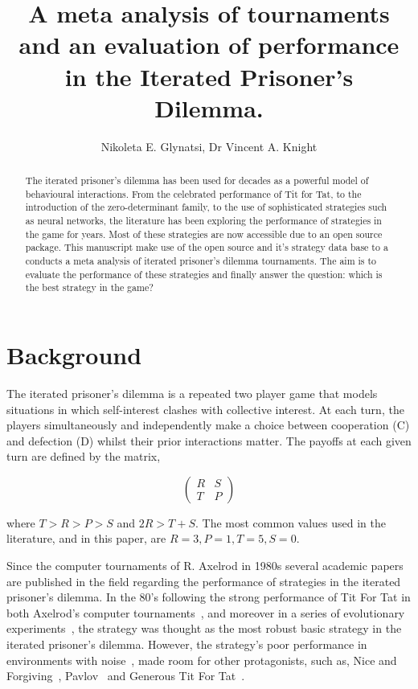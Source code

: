 \documentclass{article}
\title{A meta analysis of tournaments and an evaluation of performance in the
Iterated Prisoner's Dilemma.}
\author{Nikoleta E. Glynatsi, Dr Vincent A. Knight}
\date{}
\begin{document}
\maketitle

\begin{abstract}

The iterated prisoner's dilemma has been used for decades as a powerful model of
behavioural interactions. From the celebrated performance of Tit for Tat, to the
introduction of the zero-determinant family, to the use of sophisticated
strategies such as neural networks, the literature has been exploring the
performance of strategies in the game for years. Most of these strategies
are now accessible due to an open source package. This manuscript make use
of the open source and it's strategy data base to a conducts a meta analysis of
iterated prisoner's dilemma tournaments. The aim is to evaluate the performance
of these strategies and finally answer the question: which is the best strategy
in the game?
\end{abstract}

\section{Background}

The iterated prisoner's dilemma is a repeated two player game that models
situations in which self-interest clashes with collective interest. At each turn,
the players simultaneously and independently make a choice between cooperation (C) and
defection (D) whilst their prior interactions matter. The payoffs at each given turn are defined by the matrix,

\[\begin{pmatrix}
R & S \\
T & P
\end{pmatrix}\]

where \(T > R > P > S\) and \(2R > T + S\). The most common values used in
the literature, and in this paper, are $R=3, P=1, T=5, S=0$.

Since the computer tournaments of R. Axelrod in 1980s several academic papers
are published in the field regarding the performance of strategies in the
iterated prisoner's dilemma. In the 80's following the strong performance of Tit For Tat
in both Axelrod's computer tournaments~\cite{Axelrod1980a, Axelrod1980b}, and
moreover in a series of evolutionary experiments~\cite{Axelrod1981}, the strategy
was thought as the most robust basic strategy in the iterated prisoner's
dilemma. However, the strategy's poor performance in environments with
noise~\cite{Bendor1991, Donninger1986, Molander1985, Hammerstein1984},
made room for other protagonists, such as, Nice and Forgiving~\cite{Bendor1991},
Pavlov~\cite{Nowak1993} and Generous Tit For Tat~\cite{Nowak1992}.
\end{document}
